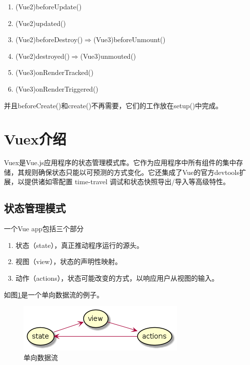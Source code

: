 \begin{enumerate}
\begin{enumerate}[label=\circled{\arabic*}]
\begin{enumerate}
                  \item (Vue2)beforeUpdate()
                  \item (Vue2)updated()
                  \item (Vue2)beforeDestroy()$\Rightarrow$(Vue3)beforeUnmount()
                  \item (Vue2)destroyed()$\Rightarrow$(Vue3)unmouted()
                  \item (Vue3)onRenderTracked()
                  \item (Vue3)onRenderTriggered()
                \end{enumerate}
                并且beforeCreate()和create()不再需要，它们的工作放在setup()中完成。
        \end{enumerate}
\end{enumerate}

\section{Vuex介绍}

Vuex是Vue.js应用程序的状态管理模式库。它作为应用程序中所有组件的集中存储，其规则确保状态只能以可预测的方式变化。它还集成了Vue的官方devtools扩展，以提供诸如零配置 time-travel 调试和状态快照导出/导入等高级特性。

\subsection{状态管理模式}

一个Vue app包括三个部分
\begin{enumerate}[label=\circled{\arabic*}]
  \item 状态（state），真正推动程序运行的源头。
  \item 视图（view），状态的声明性映射。
  \item 动作（actions），状态可能改变的方式，以响应用户从视图的输入。
\end{enumerate}

如图\ref{vuex-one-way-data-flow}是一个单向数据流的例子。

\begin{figure}[htbp]
  \centering
  \includegraphics[scale = 0.6]{out/uml/部署图/vuex-one-way-data-flow/vuex-one-way-data-flow.png}
  \caption{\song\wuhao 单向数据流}
  \label{vuex-one-way-data-flow}
\end{figure}


